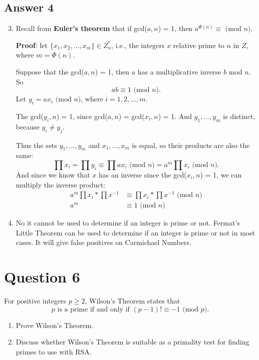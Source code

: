 \documentclass{article}
\begin{document}
	\subsection*{Answer 4}
	\renewcommand{\theenumi}{\alph{enumi}}
	\begin{enumerate}
		\setcounter{enumi}{2}
		\item Recall from \textbf{Euler's theorem} that if gcd($a,n$) = 1, then $a^{\Phi(n)} \equiv \text{ (mod $n$)}$.
		
		\textbf{Proof}: let $\{x_1,x_2,...,x_m\} \in Z_n^*$, i.e., the integers $x$ relative prime to $n$ in $Z$, where $m = \Phi(n)$.
		
		Suppose that the gcd($a,n$) = 1, then $a$ has a multiplicative inverse $b$ mod $n$. So 
		$$
		ab \equiv 1 \text{ (mod $n$)}.
		$$
		Let $y_i = ax_i \text{ (mod $n$)}$, where $i = 1,2,...,m$. 
		
		The gcd($y_i,n$) = 1, since gcd($a,n$) = gcd($x_i,n$) = 1. And $y_1,...,y_m$ is distinct, because $y_i \not= y_j$.
		
		Thus the sets $y_1,...,y_m$ and $x_1,...,x_m$ is equal, so their products are also the same:
		$$
		\prod x_i = \prod y_i \equiv \prod ax_i \text{ (mod $n$)} = a^m \prod x_i \text{ (mod $n$)}.
		$$
		And since we know that $x$ has an inverse since the gcd($x_i,n$) = 1, we can multiply the inverse product:
		\[
		\begin{split}
		a^m \prod x_i * \prod x^{-1} &\equiv \prod x_i * \prod x^{-1} \text{ (mod $n$)}\\		
		a^m &\equiv 1 \text{ (mod $n$)}
		\end{split}
		\]
	
		\item No it cannot be used to determine if an integer is prime or not. Fermat's Little Theorem can be used to determine if an integer is prime or not in most cases. It will give false positives on Carmichael Numbers.
	\end{enumerate}	

	\medspace

	\section*{Question 6}
	For positive integers $p \ge 2$, Wilson’s Theorem states that 
	$$
	p \text{ is a prime if and only if } (p - 1)!  \equiv -1 \text{ (mod $p$).}
	$$
	\renewcommand{\theenumi}{\alph{enumi}}
	\begin{enumerate}
		\item Prove Wilson’s Theorem.
		
		\item Discuss whether Wilson’s Theorem is suitable as a primality test for finding	primes to use with RSA.
	\end{enumerate}	
\end{document}
